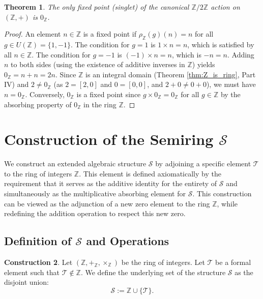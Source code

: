 \documentclass[11pt, a4paper]{article}
\theoremstyle{plain}
\newtheorem{theorem}{Theorem}[section]
\theoremstyle{definition}
\newtheorem{construction}[theorem]{Construction}
\numberwithin{equation}{section}
\newcommand{\Z}{\mathbb{Z}}
\newcommand{\Tobj}{\mathcal{T}} %
\newcommand{\SemiringS}{\mathcal{S}}
\newcommand{\Ztwo}{\mathbb{Z}/2\mathbb{Z}}
\begin{document}
\begin{theorem}\label{thm:Z_singlets}
The only fixed point (singlet) of the canonical $\Ztwo$ action on $(\Z, +)$ is $0_{\Z}$.
\end{theorem}
\begin{proof}
An element $n \in \Z$ is a fixed point if $\rho_{\Z}(g)(n)=n$ for all $g \in U(\Z)=\{1, -1\}$.
The condition for $g=1$ is $1\times n = n$, which is satisfied by all $n \in \Z$.
The condition for $g=-1$ is $(-1)\times n = n$, which is $-n=n$.
Adding $n$ to both sides (using the existence of additive inverses in $\Z$) yields $0_{\Z}=n+n=2n$.
Since $\Z$ is an integral domain (Theorem \ref{thm:Z_is_ring}, Part IV) and $2 \neq 0_{\Z}$ (as $2=[2, 0]$ and $0=[0, 0]$, and $2+0 \neq 0+0$), we must have $n=0_{\Z}$.
Conversely, $0_{\Z}$ is a fixed point since $g \times 0_{\Z} = 0_{\Z}$ for all $g \in \Z$ by the absorbing property of $0_{\Z}$ in the ring $\Z$.
\end{proof}

\section{Construction of the Semiring \texorpdfstring{$\SemiringS$}{S}}

We construct an extended algebraic structure $\SemiringS$ by adjoining a specific element $\Tobj$ to the ring of integers $\Z$. This element is defined axiomatically by the requirement that it serves as the additive identity for the entirety of $\SemiringS$ and simultaneously as the multiplicative absorbing element for $\SemiringS$. This construction can be viewed as the adjunction of a new zero element to the ring $\Z$, while redefining the addition operation to respect this new zero.

\subsection{Definition of \texorpdfstring{$\SemiringS$}{S} and Operations}

\begin{construction}\label{construction_S}
Let $(\Z, +_{\Z}, \times_{\Z})$ be the ring of integers. Let $\Tobj$ be a formal element such that $\Tobj \notin \Z$. We define the underlying set of the structure $\SemiringS$ as the disjoint union:
\begin{equation}
    \SemiringS := \Z \cup \{\Tobj\}.
\end{equation}
\end{construction}
\end{document}
